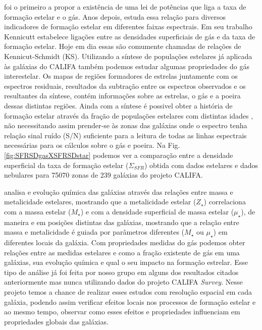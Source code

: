 \documentclass[a4paper,12pt]{article}
\begin{document}
\citet{Schmidt.1959a} foi o primeiro a propor a existência de uma lei de potências que liga a taxa
de formação estelar e o gás. Anos depois, \citet{Kennicutt.1998a} estuda essa relação para diversos
indicadores de formação estelar em diferentes faixas espectrais. Em seu trabalho Kennicutt
estabelece ligações entre as densidades superficiais de gás e da taxa de formação estelar. Hoje em
dia essas são comumente chamadas de relações de Kennicut-Schmidt (KS). Utilizando a síntese de
populações estelares já aplicada às galáxias do CALIFA também podemos estudar algumas propriedades
do gás interestelar. Os mapas de regiões formadores de estrelas juntamente com os espectros
residuais, resultados da subtração entre os espectros observados e os resultantes da síntese, contém
informações sobre as estrelas, o gás e a poeira dessas distintas regiões. Ainda com a síntese é
possivel obter a história de formação estelar através da fração de populações estelares com
distintas idades \citep{Asari.etal.2007a}, não necessitando assim prender-se às zonas das galáxias
onde o espectro tenha relação sinal ruído (S/N) suficiente para a leitura de todas as linhas
espectrais necessárias para os cálculos sobre o gás e poeira. Na Fig. \ref{fig:SFRSDgasXSFRSDstar}
podemos ver a comparação entre a densidade superficial da taxa de formação estelar ($\Sigma_{SFR}$)
obtida com dados estelares e dados nebulares para 75070 zonas de 239 galáxias do projeto CALIFA.

\citet{GonzalezDelgado.etal.2014b} analisa e evolução química das galáxias através das relações
entre massa e metalicidade estelares, mostrando que a metalicidade estelar ($Z_\star$) correlaciona
com a massa estelar ($M_\star$) e com a densidade superficial de massa estelar ($\mu_\star$), de
maneira e em posições distintas das galáxias, mostrando que a relação entre massa e metalicidade é
guiada por parâmetros diferentes ($M_\star$ ou $\mu_\star$) em diferentes locais da galáxia. Com
propriedades medidas do gás podemos obter relações entre as medidas estelares e  como a fração
existente de gás em uma galáxias, sua evolução química e qual o seu impacto na formação estrelar.
Esse tipo de análise já foi feita por nosso grupo em alguns dos resultados citados anteriormente mas
nunca utilizando dados do projeto CALIFA {\em Survey}. Nesse projeto temos a chance de realizar
esses estudos com resolução espacial em cada galáxia, podendo assim verificar efeitos locais nos
processos de formação estelar e ao mesmo tempo, observar como esses efeitos e propriedades
influenciam em propriedades globais das galáxias.
\end{document}
